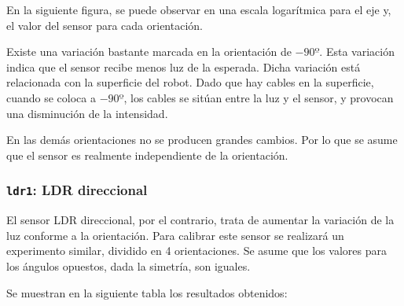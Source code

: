 \documentclass[10pt,a4paper,hidelinks,twocolumn]{article}
\begin{document}
En la siguiente figura, se puede observar en una escala logarítmica para el eje 
y, el valor del sensor para cada orientación.


Existe una variación bastante marcada en la orientación de $-90º$. Esta 
variación indica que el sensor recibe menos luz de la esperada. Dicha variación 
está relacionada con la superficie del robot. Dado que hay cables en la 
superficie, cuando se coloca a $-90º$, los cables se sitúan entre la luz y el 
sensor, y provocan una disminución de la intensidad.

En las demás orientaciones no se producen grandes cambios. Por lo que se asume 
que el sensor es realmente independiente de la orientación.

\subsubsection{\texttt{ldr1}: LDR direccional}
El sensor LDR direccional, por el contrario, trata de aumentar la variación de 
la luz conforme a la orientación. Para calibrar este sensor se realizará un 
experimento similar, dividido en 4 orientaciones. Se asume que los valores para 
los ángulos opuestos, dada la simetría, son iguales.

Se muestran en la siguiente tabla los resultados obtenidos:
\end{document}
